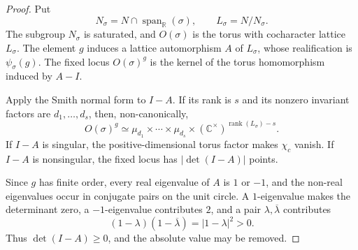 \documentclass[10pt,a4paper]{amsart}
\begin{document}
\begin{proof}
Put
\[
N_\sigma=N\cap\operatorname{span}_\mathbb{R}(\sigma),
  \qquad L_\sigma=N/N_\sigma.
\]
The subgroup $N_\sigma$ is saturated, and $O(\sigma)$ is the torus with
cocharacter lattice $L_\sigma$.  The element $g$ induces a lattice
automorphism $A$ of $L_\sigma$, whose realification is
$\psi_\sigma(g)$.  The fixed locus $O(\sigma)^g$ is the kernel of the torus
homomorphism induced by $A-I$.

Apply the Smith normal form to $I-A$.  If its rank is $s$ and its nonzero
invariant factors are $d_1,\ldots,d_s$, then, non-canonically,
\begin{equation*}
  O(\sigma)^g
  \simeq
  \mu_{d_1}\times\cdots\times\mu_{d_s}
  \times(\mathbb{C}^\times)^{\operatorname{rank}(L_\sigma)-s}.
\end{equation*}
If $I-A$ is singular, the positive-dimensional torus factor makes
$\chi_c$ vanish.  If $I-A$ is nonsingular, the fixed locus has
$|\det(I-A)|$ points.

Since $g$ has finite order, every real eigenvalue of $A$ is $1$ or $-1$,
and the non-real eigenvalues occur in conjugate pairs on the unit circle.  A
$1$-eigenvalue makes the determinant zero, a $-1$-eigenvalue contributes
$2$, and a pair $\lambda,\overline\lambda$ contributes
\[
  (1-\lambda)(1-\overline\lambda)=|1-\lambda|^2>0.
\]
Thus $\det(I-A)\geq0$, and the absolute value may be removed.
\end{proof}
\end{document}
